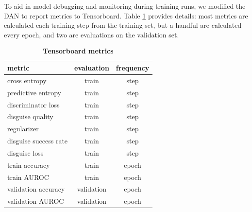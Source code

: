\documentclass{proc}
\begin{document}
To aid in model debugging and monitoring during training runs, we modified the DAN to report metrics to Tensorboard. Table \ref{table:tensorboard-summaries} provides details: most metrics are calculated each training step from the training set, but a handful are calculated every epoch, and two are evaluations on the validation set.
\begin{table}[]
\begin{center}
	\begin{tabular}{|l|c|c|}
		\hline
 		\textbf{metric} &  \textbf{evaluation} & \textbf{frequency}\\ \hline
 		cross entropy & train & step \\ \hline
 		predictive entropy & train & step\\ \hline
		discriminator loss & train & step\\ \hline
		disguise quality & train & step \\ \hline
		regularizer & train & step\\ \hline
		disguise success rate & train & step\\ \hline
		disguise loss & train & step\\ \hline
		train accuracy & train & epoch\\ \hline
		train AUROC & train & epoch\\ \hline
		validation accuracy & validation & epoch\\ \hline
		validation AUROC & validation & epoch\\ \hline
	\end{tabular}
	\caption{\textbf{Tensorboard metrics}}
	\label{table:tensorboard-summaries}
\end{center}
\end{table}
\end{document}
